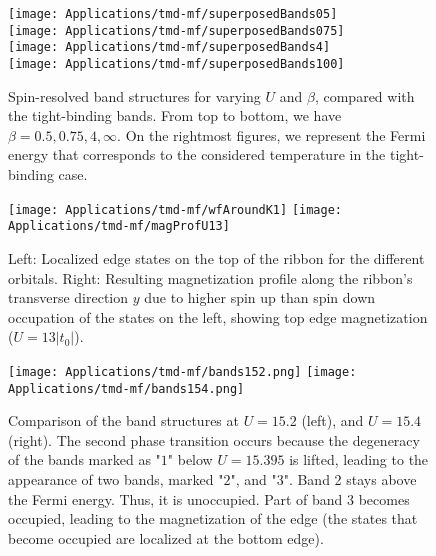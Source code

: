 \begin{figure}[H]
\centering
\texttt{[image: Applications/tmd-mf/superposedBands05]} \\
\texttt{[image: Applications/tmd-mf/superposedBands075]} \\
\texttt{[image: Applications/tmd-mf/superposedBands4]} \\
\texttt{[image: Applications/tmd-mf/superposedBands100]} \\
	\caption[Spin-resolved band structures for varying $U$ and $\beta$, compared with the tight-binding bands.]{Spin-resolved band structures for varying $U$ and $\beta$, compared with the tight-binding bands.
	From top to bottom, we have $\beta = 0.5, 0.75, 4, \infty$.
	On the rightmost figures, we represent the Fermi energy that corresponds to the considered temperature in the tight-binding case.}
	\label{fig:band-structures}
\end{figure}
\begin{figure}[H]
\hspace{1cm}
\texttt{[image: Applications/tmd-mf/wfAroundK1]}
\texttt{[image: Applications/tmd-mf/magProfU13]}
	\caption[Localized edge states on the top of the ribbon for the different orbitals. Resulting magnetization profile along the ribbon's transverse direction due to higher spin up than spin down occupation.]{Left: Localized edge states on the top of the ribbon for the different orbitals. Right: Resulting magnetization profile along the ribbon's transverse direction $y$ due to higher spin up than spin down occupation of the states on the left, showing top edge magnetization ($U = 13 |t_0|$).}
	\label{fig:wfs1}
\end{figure}
\begin{figure}[H]
\hspace{1.2cm}
\texttt{[image: Applications/tmd-mf/bands152.png]}
\hspace{4mm}
\texttt{[image: Applications/tmd-mf/bands154.png]}
	\caption[Comparison of the band structures at $U = 15.2$, and $U=15.4$.]{Comparison of the band structures at $U = 15.2$ (left), and $U=15.4$ (right). The second phase transition occurs because the degeneracy of the bands marked as "$1$" below $U = 15.395$ is lifted, leading to the appearance of two bands, marked "$2$", and "$3$". Band 2 stays above the Fermi energy. Thus, it is unoccupied. Part of band 3 becomes occupied, leading to the magnetization of the edge (the states that become occupied are localized at the bottom edge).}
	\label{fig:bandDegen}
\end{figure}
